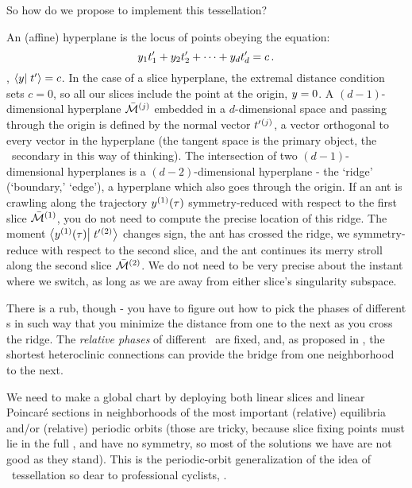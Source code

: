 So how do we propose to implement this tessellation?



An (affine) hyperplane is the locus of points obeying the equation:
\[
y_1t'_{1} + y_2t'_{2} + \cdots + y_dt'_{d} = c
\,.
\]
\ie, $\braket{\sspRed}{\sliceTan{}}=c$. In the case of a slice
hyperplane, the extremal distance condition  sets $c=0$,
so all our slices include the point at the origin, $y=0$. A
$(d\!-\!1)$-dimensional hyperplane $\pSRed{}^{(j)}$ embedded in a
$d$-dimensional space and passing through the origin is defined by the
normal vector $t'_{}{}^{(j)}$, a vector orthogonal to every vector
in the hyperplane (the tangent space \sliceTan{} is the primary object,
the {\template} \slicep\ secondary in this way of thinking). The
intersection of two $(d\!-\!1)$-dimensional hyperplanes is a
$(d\!-\!2)$-dimensional hyperplane - the `ridge' (`boundary,'  `edge'),
a hyperplane which also goes through the origin. If an ant is
crawling along the trajectory $y{}^{(1)}(\tau)$ symmetry-reduced
with respect to the first slice $\pSRed{}^{(1)}$, you do not need to
compute the precise location of this ridge. The moment
$\braket{\sspRed{}^{(1)}(\tau)}{\sliceTan{}{}^{(2)}}$ changes sign, the
ant has crossed the ridge, we symmetry-reduce with respect to the second
slice,
and the ant continues its merry stroll along the second slice
$\pSRed{}^{(2)}$. We
do not need to be very precise about the instant where we switch, as long
as we are away from either slice's singularity subspace.

There is a rub, though - you have to figure out how to pick the phases of
different {\template s} in such way that you
minimize the distance from one to the next as you cross the ridge.
The {\em relative phases} of different \reqva\ are fixed, and, as
proposed in , the shortest heteroclinic connections
can provide the bridge from one neighborhood to the next.

We need to make a global chart by deploying both linear slices and linear
Poincar\'e sections in neighborhoods of the most important (relative)
equilibria and/or (relative) periodic orbits (those are tricky, because
slice fixing points must lie in the full \statesp, and have no symmetry,
so most of the solutions we have are not good as they stand). This is the
periodic-orbit generalization of the idea of
{\statesp\ tessellation}
so dear to professional cyclists, .

